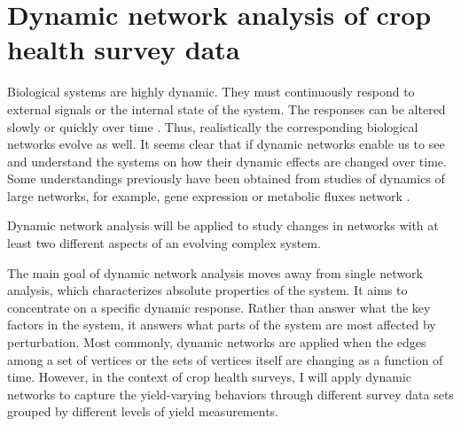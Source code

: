 

 

\section*{Dynamic network analysis of crop health survey data}


Biological systems are highly dynamic. They must continuously respond to external signals or the internal state of the system. The responses can be altered slowly or quickly over time . 
Thus, realistically the corresponding biological networks evolve as well.  It seems clear that if dynamic networks enable us to see and understand the systems on how their dynamic effects are changed over time. Some understandings previously have been obtained from studies of dynamics of large networks, for example, gene expression or metabolic fluxes network .
 
Dynamic network analysis will be applied to study changes in networks with at least two different aspects of an evolving complex system. 

The main goal of dynamic network analysis moves away from single network analysis, which characterizes absolute properties of the system. It aims to concentrate on a specific dynamic response. Rather than answer what the key factors in the system, it answers what parts of the system are most affected by perturbation. Most commonly, dynamic networks are applied when the edges among a set of vertices or the sets of vertices itself are changing as a function of time. However, in the context of crop health surveys, I will apply dynamic networks to capture the yield-varying behaviors through different survey data sets grouped by different levels of yield measurements.

